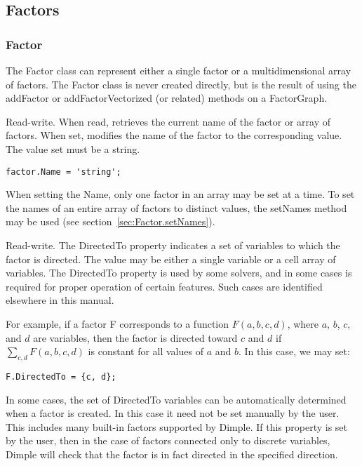 \subsection{Factors}

\subsubsection{Factor}

The Factor class can represent either a single factor or a multidimensional array of factors.  The Factor class is never created directly, but is the result of using the addFactor or addFactorVectorized (or related) methods on a FactorGraph.



Read-write.  When read, retrieves the current name of the factor or array of factors.  When set, modifies the name of the factor to the corresponding value.  The value set must be a string.

\begin{lstlisting}
factor.Name = 'string';
\end{lstlisting}

When setting the Name, only one factor in an array may be set at a time.  To set the names of an entire array of factors to distinct values, the setNames method may be used (see section~\ref{sec:Factor.setNames}).


\label{sec:Factor.DirectedTo}

Read-write.  The DirectedTo property indicates a set of variables to which the factor is directed.  The value may be either a single variable or a cell array of variables.  The DirectedTo property is used by some solvers, and in some cases is required for proper operation of certain features.  Such cases are identified elsewhere in this manual.

For example, if a factor F corresponds to a function $F(a, b, c, d)$, where $a$, $b$, $c$, and $d$ are variables, then the factor is directed toward $c$ and $d$ if $\sum_{c, d} F(a, b, c, d)$ is constant for all values of $a$ and $b$.  In this case, we may set:

\begin{lstlisting}
F.DirectedTo = {c, d};
\end{lstlisting}

In some cases, the set of DirectedTo variables can be automatically determined when a factor is created.  In this case it need not be set manually by the user.  This includes many built-in factors supported by Dimple.  If this property is set by the user, then in the case of factors connected only to discrete variables, Dimple will check that the factor is in fact directed in the specified direction.

